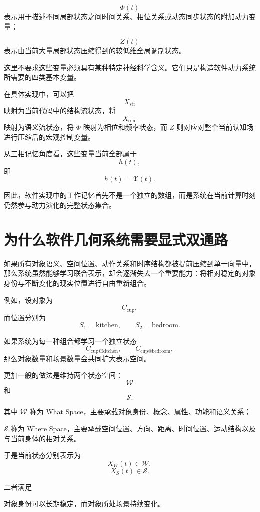 \[
\Phi(t)
\]
表示用于描述不同局部状态之间时间关系、相位关系或动态同步状态的附加动力变量；

\[
Z(t)
\]
表示由当前大量局部状态压缩得到的较低维全局调制状态。

这里不要求这些变量必须具有某种特定神经科学含义。它们只是构造软件动力系统所需要的四类基本变量。

在具体实现中，可以把
\[
X_{\mathrm{str}}
\]
映射为当前代码中的结构流状态，将
\[
X_{\mathrm{sem}}
\]
映射为语义流状态，将 $\Phi$ 映射为相位和频率状态，而 $Z$ 则对应对整个当前认知场进行压缩后的宏观控制变量。

从三相记忆角度看，这些变量当前全部属于
\[
h(t),
\]
即
\[
\boxed{
h(t)
=
\mathcal{X}(t).
}
\]

因此，软件实现中的工作记忆首先不是一个独立的数组，而是系统在当前计算时刻仍然参与动力演化的完整状态集合。

\section{为什么软件几何系统需要显式双通路}

如果所有对象语义、空间位置、动作关系和时序结构都被提前压缩到单一向量中，那么系统虽然能够学习联合表示，却会逐渐失去一个重要能力：将相对稳定的对象身份与不断变化的现实位置进行自由重新组合。

例如，设对象为
\[
C_{\mathrm{cup}},
\]
而位置分别为
\[
S_1=\mathrm{kitchen},
\qquad
S_2=\mathrm{bedroom}.
\]

如果系统为每一种组合都学习一个独立状态
\[
C_{\mathrm{cup@kitchen}},
\qquad
C_{\mathrm{cup@bedroom}},
\]
那么对象数量和场景数量会共同扩大表示空间。

更加一般的做法是维持两个状态空间：
\[
\boxed{
\mathcal{W}
}
\]
和
\[
\boxed{
\mathcal{S}.
}
\]

其中 $\mathcal{W}$ 称为 What Space，主要承载对象身份、概念、属性、功能和语义关系；

$\mathcal{S}$ 称为 Where Space，主要承载空间位置、方向、距离、时间位置、运动结构以及与当前身体的相对关系。

于是当前状态分别表示为
\[
X_W(t)\in\mathcal{W},
\]
\[
X_S(t)\in\mathcal{S}.
\]

二者满足
\begin{statementbox}
\centering
{}
\end{statementbox}

对象身份可以长期稳定，而对象所处场景持续变化。

